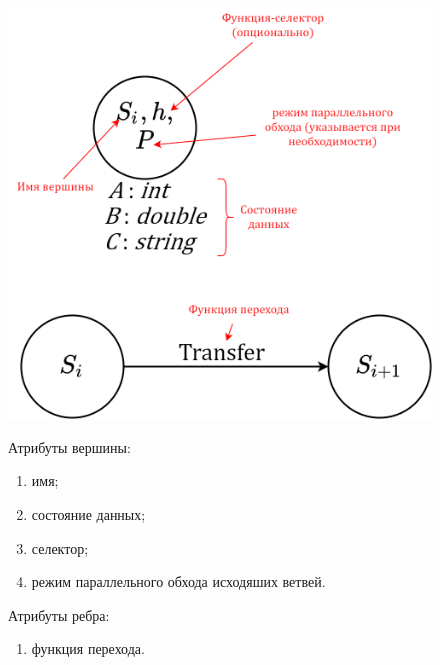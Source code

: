 \begin{frame}
	\begin{figure}
		\begin{minipage}{0.49\textwidth}
			\centering
			\includegraphics[width=\textwidth]{images/illustration.node.png}
		\end{minipage}\hfill\begin{minipage}{0.49\textwidth}
			Атрибуты вершины:
			\begin{enumerate}
				\item имя;
				\item состояние данных;
				\item селектор;
				\item режим параллельного обхода исходяших ветвей.
			\end{enumerate}
			Атрибуты ребра:
			\begin{enumerate}
				\item функция перехода.
			\end{enumerate}
		\end{minipage}\hfill
	\end{figure}
\end{frame}

